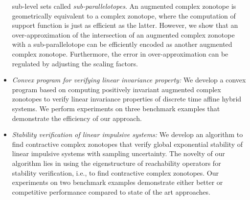 \begin{itemize}
  sub-level sets called \emph{sub-parallelotopes}.  An augmented
  complex zonotope is geometrically equivalent to a complex zonotope,
  where the computation of support function is just as efficient as
  the latter.  However, we show that an over-approximation of the
  intersection of an augmented complex zonotope with a
  sub-parallelotope can be efficiently encoded as another augmented
  complex zonotope.  Furthermore, the error in
  over-approximation can be regulated by adjusting the scaling
  factors.
\item \emph{Convex program for verifying linear invariance property:
}  We develop a convex program based on computing positively invariant
  augmented complex zonotopes to verify linear invariance properties
  of discrete time affine hybrid systems.  We perform experiments on
  three benchmark examples that demonstrate the efficiency of our
  approach. 
\item \emph{Stability verification of linear impulsive systems: } We
  develop an algorithm to find contractive complex zonotopes that
  verify global exponential stability of linear impulsive systems with
  sampling uncertainty.  The novelty of our algorithm lies in using
  the eigenstructure of reachability operators for stability
  verification, i.e., to find contractive complex zonotopes. Our
  experiments on two benchmark examples demonstrate either better or
  competitive performance compared to state of the art approaches.
\end{itemize}
%
